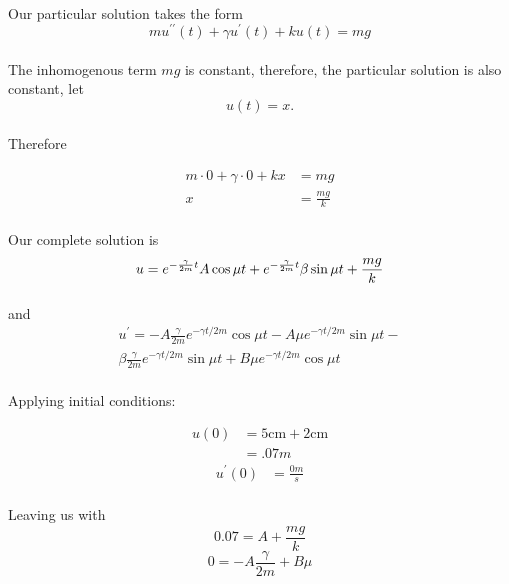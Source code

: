 \documentclass{article}
\begin{document}
\paragraph{}Our particular solution takes the form
\[
    mu^{\prime\prime}(t) + \gamma u^{\prime}(t) +k u(t) = mg
\]
\paragraph{}The inhomogenous term $mg$ is constant, therefore, the particular solution is also constant, let
\[
    u(t) = x.
\]
\paragraph{}Therefore

\begin{align*}
    m\cdot 0 + \gamma\cdot 0 +k x &= mg\\
                             x &= \frac{mg}{k} 
\end{align*}
\paragraph{}Our complete solution is
\[
    u=e^{-\frac{\gamma}{2m} t}A \cos \mu t+ e^{-\frac{\gamma}{2m} t}\beta \sin \mu t + \frac{mg}{k}\\
\]

\paragraph{}and
\begin{align*}
    u^{\prime}=-A \frac{\gamma}{2 m} e^{-\gamma t / 2 m} \cos \mu t-A \mu
    e^{-\gamma t / 2 m} \sin \mu t- \\ 
    \beta \frac{\gamma}{2 m} e^{-\gamma t / 2 m}
    \sin \mu t+B \mu e^{-\gamma t / 2 m} \cos \mu t
\end{align*}
\paragraph{}Applying initial conditions:

\begin{align*}
    u(0)&= 5 \mathrm{cm} + 2 \mathrm{cm} \\
        &= .07m
\end{align*}
\begin{align*}
    u^{\prime}(0)&=\frac{0m}{s}
\end{align*}
\paragraph{}Leaving us with 
\[
    0.07 = A + \frac{mg}{k}
\]
\[
    0 = -A \frac{\gamma}{2m} + B\mu
\]
\end{document}
